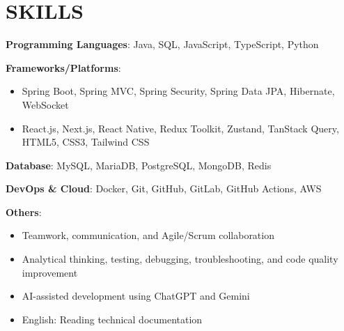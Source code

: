 \section{SKILLS}
\resumeSubHeadingListStart

  \item
    \resumeItemListStart
      \item \textbf{Programming Languages}: Java, SQL, JavaScript, TypeScript, Python
      \item \textbf{Frameworks/Platforms}:
        \begin{itemize}
          \item Spring Boot, Spring MVC, Spring Security, Spring Data JPA, Hibernate, WebSocket
          \item React.js, Next.js, React Native, Redux Toolkit, Zustand, TanStack Query, HTML5, CSS3, Tailwind CSS
        \end{itemize}
      \item \textbf{Database}: MySQL, MariaDB, PostgreSQL, MongoDB, Redis
      \item \textbf{DevOps \& Cloud}: Docker, Git, GitHub, GitLab, GitHub Actions, AWS
      \item \textbf{Others}:
        \begin{itemize}
          \item Teamwork, communication, and Agile/Scrum collaboration
          \item Analytical thinking, testing, debugging, troubleshooting, and code quality improvement
          \item AI-assisted development using ChatGPT and Gemini
          \item English: Reading technical documentation
        \end{itemize}
    \resumeItemListEnd

\resumeSubHeadingListEnd
